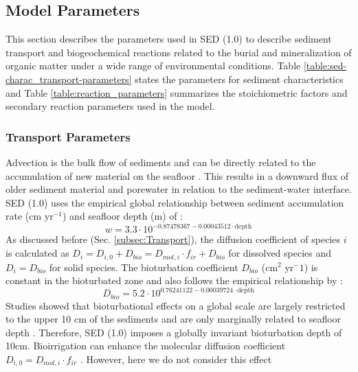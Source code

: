 \documentclass[gmd, manuscript]{copernicus}
\begin{document}
\subsection{Model Parameters}
This section describes the parameters used in SED (1.0) to describe sediment transport and biogeochemical reactions related to the burial and mineralization of organic matter under a wide range of environmental conditions. 
Table \ref{table:sed-charac_transport-parameters} states the parameters for sediment characteristics and Table \ref{table:reaction_parameters} summarizes the stoichiometric factors and 
secondary reaction parameters used in the model.

\subsubsection{Transport Parameters}
Advection is the bulk flow of sediments and can be directly related to the accumulation of new material on the seafloor \citep[i.e. sedimentation,][]{burdige2006geochemistry}. 
This results in a downward flux of older sediment material and porewater in relation to the sediment-water interface. SED (1.0) uses the empirical global relationship between 
sediment accumulation rate (cm yr$^{-1}$) and seafloor depth (m) of \citet{middelburg_empirical_1997}: 
\begin{equation}
 w = 3.3\cdot 10^{-0.87478367-0.00043512\cdot \text{depth}}\label{eq:sedimentation_rate}
\end{equation}
As discussed before (Sec. \ref{subsec:Transport}), the diffusion coefficient of species $i$ is calculated as $D_i=D_{i,0}+D_{bio}=D_{mol,i}\cdot f_{ir}+D_{bio}$ for dissolved species and $D_i=D_{bio}$ for solid species. 
The bioturbation coefficient $D_{bio}$ (cm$^2$ yr$^-1$) is constant in the bioturbated zone and also follows the empirical relationship by \citet{middelburg_empirical_1997}:
\begin{equation}
 D_{bio} = 5.2\cdot 10^{0.76241122-0.00039724\cdot \text{depth}}\label{eq:bioturbation_coeff}
\end{equation}
Studies showed that bioturbational effects on a global scale are largely restricted to the upper 10 cm of the sediments and are only marginally related to seafloor depth \citep[e.g.][]{boudreau_mean_1998, teal_global_2010}. 
Therefore, SED (1.0) imposes a globally invariant bioturbation depth of 10cm. 
Bioirrigation can enhance the molecular diffusion coefficient $D_{i,0}=D_{mol,i}\cdot f_{ir}$ \citep{soetaert1996dynamic}. However, here we do not consider this effect 
\end{document}
